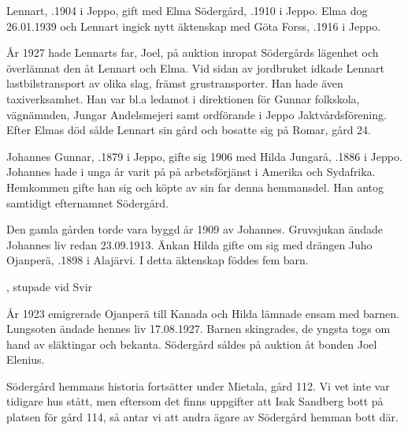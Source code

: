 Lennart, .1904 i Jeppo, gift med Elma Södergård, .1910 i Jeppo. Elma dog 26.01.1939 och Lennart ingick nytt äktenskap med Göta Forss, .1916  i Jeppo.
\begin{jhchildren}
  \item {}
  \item {}
  \item {}
  \item {}
\end{jhchildren}
År 1927 hade Lennarts far, Joel, på auktion inropat Södergårds lägenhet och överlämnat den åt Lennart och Elma. Vid sidan av jordbruket idkade Lennart lastbilstransport av olika slag, främst grustransporter. Han hade även taxiverksamhet. Han var bl.a ledamot i direktionen för Gunnar folkskola, vägnämnden, Jungar Andelsmejeri samt ordförande i Jeppo Jaktvårdsförening. Efter Elmas död sålde Lennart sin gård och bosatte sig på Romar, gård 24.


Johannes Gunnar, .1879 i Jeppo, gifte sig 1906 med Hilda Jungarå, .1886 i Jeppo. Johannes hade i unga år varit på på arbetsförjänst i Amerika och Sydafrika. Hemkommen gifte han sig och köpte av sin far denna hemmansdel. Han antog samtidigt efternamnet Södergård.
\begin{jhchildren}
  \item {}
  \item {}
  \item {}
  \item {}
\end{jhchildren}

Den gamla gården torde vara byggd år 1909 av Johannes. Gruvsjukan ändade Johannes liv redan 23.09.1913. Änkan Hilda gifte om sig med drängen Juho Ojanperä, .1898 i Alajärvi. I detta äktenskap föddes fem barn.
\begin{jhchildren}
  \item {}
  \item {}
  \item {}
  \item {}, stupade vid Svir
  \item {}
\end{jhchildren}
År 1923 emigrerade Ojanperä till Kanada och Hilda lämnade ensam med barnen. Lungsoten ändade hennes liv 17.08.1927. Barnen skingrades, de yngsta togs om hand av släktingar och bekanta. Södergård såldes på auktion åt bonden Joel Elenius.

Södergård hemmans historia fortsätter under Mietala, gård 112. Vi vet inte var tidigare hus stått, men eftersom det finns uppgifter att Isak Sandberg bott på platsen för gård 114, så antar vi att andra ägare av Södergård hemman bott där.
